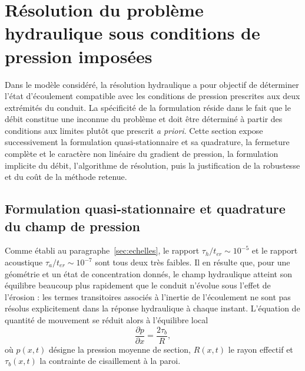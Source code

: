 \documentclass[11pt,a4paper]{report}
\newcommand{\ter}{{t_{er}}}
\begin{document}


\section{Résolution du problème hydraulique sous conditions de pression imposées}
\label{sec:hydraulique}

Dans le modèle considéré, la résolution hydraulique a pour objectif de déterminer l'état d'écoulement
compatible avec les conditions de pression prescrites aux deux extrémités du conduit. La spécificité de la
formulation réside dans le fait que le débit constitue une inconnue du problème et doit être déterminé à
partir des conditions aux limites plutôt que prescrit \emph{a priori}. Cette section expose successivement
la formulation quasi-stationnaire et sa quadrature, la fermeture complète et le caractère non linéaire du
gradient de pression, la formulation implicite du débit, l'algorithme de résolution, puis la justification
de la robustesse et du coût de la méthode retenue.

\subsection{Formulation quasi-stationnaire et quadrature du champ de pression}

Comme établi au paragraphe~\ref{sec:echelles}, le rapport \(\tau_h/\ter \sim 10^{-5}\) et le rapport
acoustique \(\tau_a/\ter \sim 10^{-7}\) sont tous deux très faibles. Il en résulte que, pour une géométrie
et un état de concentration donnés, le champ hydraulique atteint son équilibre beaucoup plus rapidement
que le conduit n'évolue sous l'effet de l'érosion : les termes transitoires associés à l'inertie de
l'écoulement ne sont pas résolus explicitement dans la réponse hydraulique à chaque instant. L'équation
de quantité de mouvement se réduit alors à l'équilibre local
\begin{equation}
\frac{\partial p}{\partial x} = \frac{2\tau_b}{R},
\label{eq:quasi}
\end{equation}
où \(p(x,t)\) désigne la pression moyenne de section, \(R(x,t)\) le rayon effectif et \(\tau_b(x,t)\) la
contrainte de cisaillement à la paroi.
\end{document}
